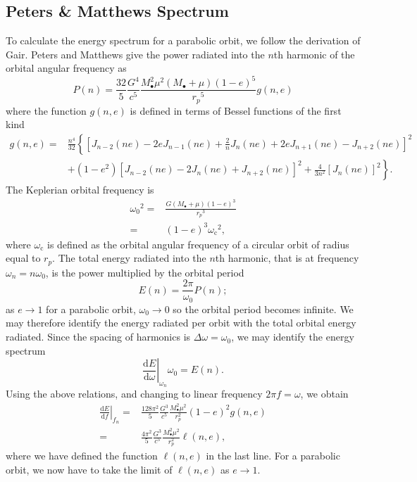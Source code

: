 \documentclass[a4paper, 11pt, titlepage, twoside]{report}
\newcommand{\sub}[1]{\ensuremath{_\mathrm{#1}}}
\newcommand{\dd}{\ensuremath{\mathrm{d}}}
\newcommand{\diff}[2]{\ensuremath{\frac{\dd {#1}}{\dd {#2}}}}
\begin{document}
\subsection{Peters \& Matthews Spectrum}

To calculate the energy spectrum for a parabolic orbit, we follow the derivation of Gair\cite{Gair2010}. Peters and Matthews give the power radiated into the $n$th harmonic of the orbital angular frequency as
\begin{equation}
P(n) = \frac{32}{5}\frac{G^4}{c^5}\frac{M_\bullet^2\mu^2(M_\bullet + \mu)(1-e)^5}{{r_p}^5}g(n,e)
\label{eq:PM_P}
\end{equation}
where the function $g(n,e)$ is defined in terms of Bessel functions of the first kind
\begin{align}
g(n,e) = {} & \frac{n^4}{32}\left\{\left[J_{n-2}(ne) - 2eJ_{n-1}(ne) + \frac{2}{n}J_n(ne) + 2eJ_{n+1}(ne) - J_{n+2}(ne)\right]^2 \right. \nonumber \\
 & + \left. \left(1 - e^2\right)\left[J_{n-2}(ne) - 2J_n(ne) + J_{n+2}(ne)\right]^2 + \frac{4}{3n^2}\left[J_n(ne)\right]^2\right\}.
\end{align}
The Keplerian orbital frequency is
\begin{align}
{\omega_0}^2 = {} & \frac{G(M_\bullet + \mu)(1-e)^3}{{r_p}^3}\\
 = {} & (1-e)^3{\omega\sub{c}}^2,
\label{eq:Kepler_freq}
\end{align}
where $\omega\sub{c}$ is defined as the orbital angular frequency of a circular orbit of radius equal to $r_p$. The total energy radiated into the $n$th harmonic, that is at frequency $\omega_n = n\omega_0$, is the power multiplied by the orbital period
\begin{equation}
E(n) = \frac{2\pi}{\omega_0}P(n);
\label{eq:E(n)}
\end{equation}
as $e \rightarrow 1$ for a parabolic orbit, $\omega_0 \rightarrow 0$ so the orbital period becomes infinite. We may therefore identify the energy radiated per orbit with the total orbital energy radiated. Since the spacing of harmonics is $\Delta\omega = \omega_0$, we may identify the energy spectrum
\begin{equation}
\left.\diff{E}{\omega}\right|_{\omega_n}\omega_0 = E(n).
\end{equation}
Using the above relations, and changing to linear frequency $2\pi f = \omega$, we obtain
\begin{align}
\left.\diff{E}{f}\right|_{f_n} = {} & \frac{128\pi^2}{5}\frac{G^3}{c^5}\frac{M_\bullet^2\mu^2}{r_p^2}(1-e)^2g(n,e) \\
 = {} & \frac{4\pi^2}{5}\frac{G^3}{c^5}\frac{M_\bullet^2\mu^2}{r_p^2}\ell(n,e),
\label{eq:PM_spectrum}
\end{align}
where we have defined the function $\ell(n,e)$ in the last line. For a parabolic orbit, we now have to take the limit of $\ell(n,e)$ as $e \rightarrow 1$.
\end{document}

